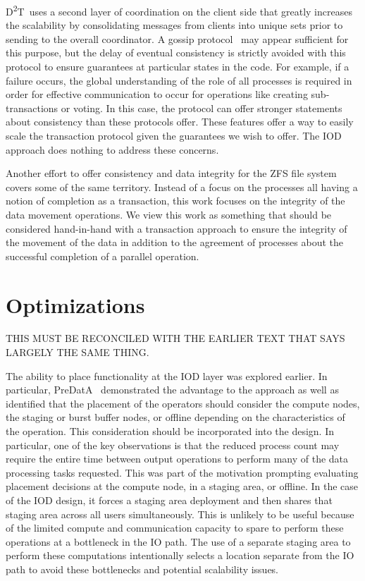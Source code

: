 \documentclass[conference]{sig-alt-gov2}
\newcommand{\DDT}{D\textsuperscript{2}T~}
\begin{document}
\DDT uses a second layer of coordination on the client side that greatly
increases the scalability by consolidating messages from clients into unique
sets prior to sending to the overall coordinator. A gossip
protocol~\cite{ganesh:2003:gossip-protocols} may appear sufficient for this
purpose, but the delay of eventual consistency is strictly avoided with this
protocol to ensure guarantees at particular states in the code. For example, if
a failure occurs, the global understanding of the role of all processes is
required in order for effective communication to occur for operations like
creating sub-transactions or voting. In this case, the protocol can offer
stronger statements about consistency than these protocols offer.  These
features offer a way to easily scale the transaction protocol given the
guarantees we wish to offer. The IOD approach does nothing to address these
concerns.

Another effort to offer consistency and data integrity for the ZFS file
system~\cite{zhang:2010:zfs} covers some of the same territory. Instead of a
focus on the processes all having a notion of completion as a transaction, this
work focuses on the integrity of the data movement operations. We view this
work as something that should be considered hand-in-hand with a transaction
approach to ensure the integrity of the movement of the data in addition to the
agreement of processes about the successful completion of a parallel operation.

\section{Optimizations}
\label{sec:optimizations}

THIS MUST BE RECONCILED WITH THE EARLIER TEXT THAT SAYS LARGELY THE SAME THING.

The ability to place functionality at the IOD layer was explored earlier. In
particular, PreDatA~\cite{zheng:2010:predata} demonstrated the advantage to
the approach as well as identified that the placement of the operators should
consider the compute nodes, the staging or burst buffer nodes, or offline
depending on the characteristics of the operation. This consideration should
be incorporated into the design. In particular, one of the key observations
is that the reduced process count may require the entire time between output
operations to perform many of the data processing tasks requested. This was
part of the motivation prompting evaluating placement decisions at the compute
node, in a staging area, or offline. In the case of the IOD design, it forces
a staging area deployment and then shares that staging area across all users
simultaneously. This is unlikely to be useful because of the limited compute
and communication capacity to spare to perform these operations at a bottleneck
in the IO path. The use of a separate staging area to perform these computations
intentionally selects a location separate from the IO path to avoid these
bottlenecks and potential scalability issues.
\end{document}
